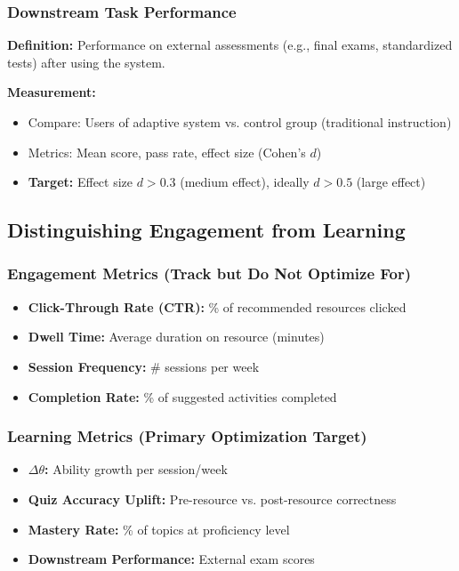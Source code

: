 \documentclass[11pt,letterpaper]{article}
\begin{document}
\subsubsection{Downstream Task Performance}

\textbf{Definition:} Performance on external assessments (e.g., final exams, standardized tests) after using the system.

\textbf{Measurement:}
\begin{itemize}
\item Compare: Users of adaptive system vs. control group (traditional instruction)
\item Metrics: Mean score, pass rate, effect size (Cohen's $d$)
\item \textbf{Target:} Effect size $d > 0.3$ (medium effect), ideally $d > 0.5$ (large effect)
\end{itemize}

\subsection{Distinguishing Engagement from Learning}

\subsubsection{Engagement Metrics (Track but Do Not Optimize For)}

\begin{itemize}
\item \textbf{Click-Through Rate (CTR):} \% of recommended resources clicked
\item \textbf{Dwell Time:} Average duration on resource (minutes)
\item \textbf{Session Frequency:} \# sessions per week
\item \textbf{Completion Rate:} \% of suggested activities completed
\end{itemize}

\subsubsection{Learning Metrics (Primary Optimization Target)}

\begin{itemize}
\item \textbf{$\Delta\theta$:} Ability growth per session/week
\item \textbf{Quiz Accuracy Uplift:} Pre-resource vs. post-resource correctness
\item \textbf{Mastery Rate:} \% of topics at proficiency level
\item \textbf{Downstream Performance:} External exam scores
\end{itemize}
\end{document}
